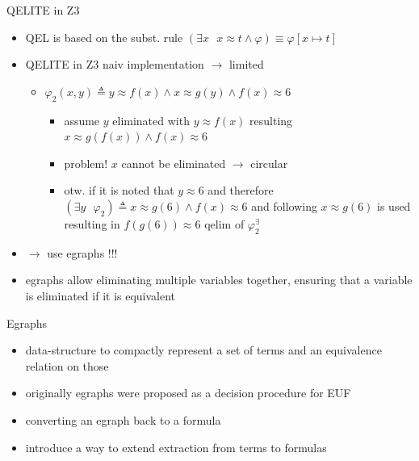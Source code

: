 \documentclass{beamer}
\begin{document}
\begin{frame}{QELITE in Z3}
      \begin{itemize}
        \item QEL is based on the subst. rule $(\exists x \textbf{ } x \approx t \land \varphi) \equiv \varphi [x \longmapsto t]$
      \pause
      \item QELITE in Z3 naiv implementation $\longrightarrow$ limited
      \begin{itemize}
      \item $\varphi_2 (x,y) \triangleq y \approx f(x) \land x \approx g(y) \land f(x) \approx 6$
      \begin{itemize}
          \item assume $y$ eliminated with $y \approx f(x)$ resulting $x \approx g(f(x)) \land f(x) \approx 6$
          \item problem! $x$ cannot be eliminated $\longrightarrow$ circular
          \item otw. if it is noted that $y \approx 6$ and therefore $(\exists y \text{ } \varphi_2) \triangleq x \approx g(6) \land f(x) \approx 6$ and following $x \approx g(6)$ is used resulting in $f(g(6)) \approx 6$ qelim of $\varphi_2^{\exists}$
      \end{itemize}
        \end{itemize}
        \pause
        \item $\longrightarrow$ use egraphs !!!
        \item egraphs allow eliminating multiple variables together, ensuring that a variable is eliminated if it is equivalent
      \end{itemize}
\end{frame}

\begin{frame}{Egraphs}
    \begin{itemize}
        \item data-structure to compactly represent a set of terms and an equivalence relation on those
         \item originally egraphs were proposed as a decision procedure for EUF
        \pause
        \item converting an egraph back to a formula
        \item introduce a way to extend extraction from terms to formulas
    \end{itemize}

\end{frame}
\end{document}
